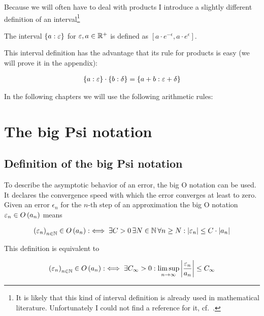 Because we will often have to deal with products I introduce a slightly different definition of an interval\footnote{It is likely that this kind of interval definition is already used in mathematical literature. Unfortunately I could not find a reference for it, cf.~\cite{tampis:ean}.}

\begin{definition}
  The interval $\ean{a}$ for $\epsilon,a\in\Rplus$ is defined as $\left[a\cdot e^{-\epsilon},a\cdot e^\epsilon\right]$.
\end{definition}

This interval definition has the advantage that its rule for products is easy (we will prove it in the appendix):

\begin{align}
  \ean[\epsilon]{a}\cdot \ean[\delta]{b} = \ean[\epsilon+\delta]{a+b}
\end{align}

\noindent In the following chapters we will use the following arithmetic rules:



\section{The big Psi notation}

\subsection{Definition of the big Psi notation}
To describe the asymptotic behavior of an error, the big O notation can be used. It declares the convergence speed with which the error converges at least to zero. Given an error $\epsilon_n$ for the $n$-th step of an approximation the big O notation $\epsilon_n \in \bigo{a_n}$ means~\cite[p.~444]{graham}\cite[p.~100]{aigner}

\begin{align} \label{bigo_def1}
  \seq{\epsilon_n} \in \bigo{a_n} :\iff \exists C > 0\, \exists N\in\N\,\forall n\ge N: \abs{\epsilon_n} \le C \cdot \abs{a_n}
\end{align}

\noindent This definition is equivalent to~\cite[p.~383]{hachenberger}\cite{wiki:bigo}

\begin{align} \label{bigo_def_limsup}
  \seq{\epsilon_n} \in \bigo{a_n} :\iff \exists C_\infty > 0: \limsup_{n\to\infty} \abs{\frac{\epsilon_n}{a_n}} \le C_\infty
\end{align}

